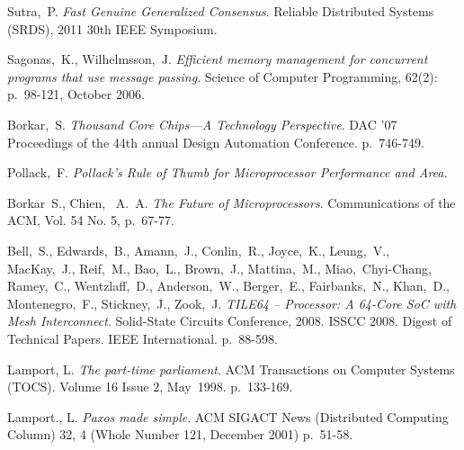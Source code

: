 \documentclass[english,11pt]{article}
\begin{document}
\clearpage
\begin{thebibliography}{9}

     Sutra,~P. \emph{Fast Genuine Generalized Consensus}. Reliable
        Distributed Systems (SRDS), 2011 30th IEEE Symposium.

     Sagonas,~K., Wilhelmsson,~J. \emph{Efficient memory
        management for concurrent programs that use message passing}. Science of
        Computer Programming, 62(2): p.~98-121, October 2006.

     Borkar,~S. \emph{Thousand Core Chips—A Technology
        Perspective}. DAC '07 Proceedings of the 44th annual Design Automation
        Conference. p.~746-749.

     Pollack,~F. \emph{Pollack's Rule of Thumb for
        Microprocessor Performance and Area.}

     Borkar~S., Chien,~ A.~A. \emph{The Future
        of Microprocessors}. Communications of the ACM, Vol. 54 No. 5, p.~67-77.

     Bell,~S., Edwards,~B., Amann,~J., Conlin,~R.,
        Joyce,~K., Leung,~V., MacKay,~J., Reif,~M., Bao,~L., Brown,~J.,
        Mattina,~M., Miao,~Chyi-Chang, Ramey,~C., Wentzlaff,~D.,
        Anderson,~W., Berger,~E., Fairbanks,~N., Khan,~D., Montenegro,~F.,
        Stickney,~J., Zook,~J. \emph{TILE64 -- Processor: A 64-Core SoC with
        Mesh Interconnect}. Solid-State Circuits Conference, 2008. ISSCC 2008.
        Digest of Technical Papers. IEEE International. p.~88-598.

     Lamport, L. \emph{The part-time parliament}. ACM
        Transactions on Computer Systems (TOCS). Volume 16 Issue 2, May~1998.
        p.~133-169.

     Lamport., L. \emph{Paxos made simple}. ACM SIGACT
        News (Distributed Computing Column) 32, 4 (Whole Number 121, December
        2001) p.~51-58.

\end{thebibliography}
\end{document}

